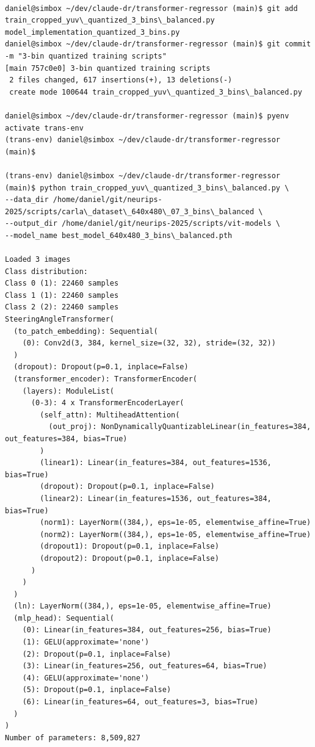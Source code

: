 \begin{verbatim}

daniel@simbox ~/dev/claude-dr/transformer-regressor (main)$ git add train_cropped_yuv\_quantized_3_bins\_balanced.py model_implementation_quantized_3_bins.py 
daniel@simbox ~/dev/claude-dr/transformer-regressor (main)$ git commit -m "3-bin quantized training scripts"
[main 757c0e0] 3-bin quantized training scripts
 2 files changed, 617 insertions(+), 13 deletions(-)
 create mode 100644 train_cropped_yuv\_quantized_3_bins\_balanced.py

daniel@simbox ~/dev/claude-dr/transformer-regressor (main)$ pyenv activate trans-env 
(trans-env) daniel@simbox ~/dev/claude-dr/transformer-regressor (main)$ 

(trans-env) daniel@simbox ~/dev/claude-dr/transformer-regressor (main)$ python train_cropped_yuv\_quantized_3_bins\_balanced.py \
--data_dir /home/daniel/git/neurips-2025/scripts/carla\_dataset\_640x480\_07_3_bins\_balanced \
--output_dir /home/daniel/git/neurips-2025/scripts/vit-models \
--model_name best_model_640x480_3_bins\_balanced.pth

Loaded 3 images
Class distribution:
Class 0 (1): 22460 samples
Class 1 (1): 22460 samples
Class 2 (2): 22460 samples
SteeringAngleTransformer(
  (to_patch_embedding): Sequential(
    (0): Conv2d(3, 384, kernel_size=(32, 32), stride=(32, 32))
  )
  (dropout): Dropout(p=0.1, inplace=False)
  (transformer_encoder): TransformerEncoder(
    (layers): ModuleList(
      (0-3): 4 x TransformerEncoderLayer(
        (self_attn): MultiheadAttention(
          (out_proj): NonDynamicallyQuantizableLinear(in_features=384, out_features=384, bias=True)
        )
        (linear1): Linear(in_features=384, out_features=1536, bias=True)
        (dropout): Dropout(p=0.1, inplace=False)
        (linear2): Linear(in_features=1536, out_features=384, bias=True)
        (norm1): LayerNorm((384,), eps=1e-05, elementwise_affine=True)
        (norm2): LayerNorm((384,), eps=1e-05, elementwise_affine=True)
        (dropout1): Dropout(p=0.1, inplace=False)
        (dropout2): Dropout(p=0.1, inplace=False)
      )
    )
  )
  (ln): LayerNorm((384,), eps=1e-05, elementwise_affine=True)
  (mlp_head): Sequential(
    (0): Linear(in_features=384, out_features=256, bias=True)
    (1): GELU(approximate='none')
    (2): Dropout(p=0.1, inplace=False)
    (3): Linear(in_features=256, out_features=64, bias=True)
    (4): GELU(approximate='none')
    (5): Dropout(p=0.1, inplace=False)
    (6): Linear(in_features=64, out_features=3, bias=True)
  )
)
Number of parameters: 8,509,827


\end{verbatim}
